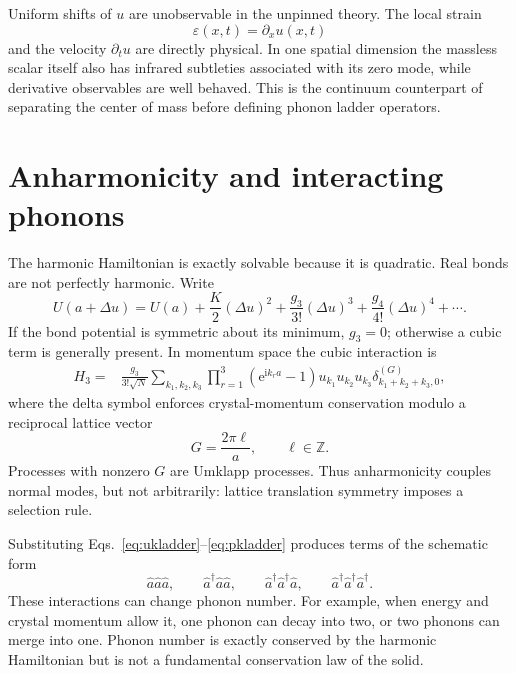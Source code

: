 \documentclass[11pt]{article}
\newcommand{\e}{\mathrm{e}}
\newcommand{\ii}{\mathrm{i}}
\begin{document}
Uniform shifts of $u$ are unobservable in the unpinned theory.  The local
strain
\begin{equation}
  \varepsilon(x,t)=\partial_xu(x,t)
\end{equation}
and the velocity $\partial_tu$ are directly physical.  In one spatial
dimension the massless scalar itself also has infrared subtleties associated
with its zero mode, while derivative observables are well behaved.  This is
the continuum counterpart of separating the center of mass before defining
phonon ladder operators.

\section{Anharmonicity and interacting phonons}

The harmonic Hamiltonian is exactly solvable because it is quadratic.  Real
bonds are not perfectly harmonic.  Write
\begin{equation}
  U(a+\Delta u)
  =U(a)+\frac K2(\Delta u)^2
  +\frac{g_3}{3!}(\Delta u)^3
  +\frac{g_4}{4!}(\Delta u)^4+\cdots.
  \label{eq:anharmonicpotential}
\end{equation}
If the bond potential is symmetric about its minimum, $g_3=0$; otherwise a
cubic term is generally present.  In momentum space the cubic interaction is
\begin{align}
  H_3
  ={}&\frac{g_3}{3!\sqrt N}
  \sum_{k_1,k_2,k_3}
  \prod_{r=1}^3(\e^{\ii k_ra}-1)
  u_{k_1}u_{k_2}u_{k_3}
  \delta^{(G)}_{k_1+k_2+k_3,0},
  \label{eq:H3momentum}
\end{align}
where the delta symbol enforces crystal-momentum conservation modulo a
reciprocal lattice vector
\begin{equation}
  G=\frac{2\pi\ell}{a},
  \qquad \ell\in\mathbb Z.
\end{equation}
Processes with nonzero $G$ are Umklapp processes.  Thus anharmonicity couples
normal modes, but not arbitrarily: lattice translation symmetry imposes a
selection rule.

Substituting Eqs.~\eqref{eq:ukladder}--\eqref{eq:pkladder} produces terms of
the schematic form
\begin{equation}
  \hat a\hat a\hat a,
  \qquad
  \hat a^\dagger\hat a\hat a,
  \qquad
  \hat a^\dagger\hat a^\dagger\hat a,
  \qquad
  \hat a^\dagger\hat a^\dagger\hat a^\dagger.
  \label{eq:cubicterms}
\end{equation}
These interactions can change phonon number.  For example, when energy and
crystal momentum allow it, one phonon can decay into two, or two phonons can
merge into one.  Phonon number is exactly conserved by the harmonic
Hamiltonian but is not a fundamental conservation law of the solid.
\end{document}
